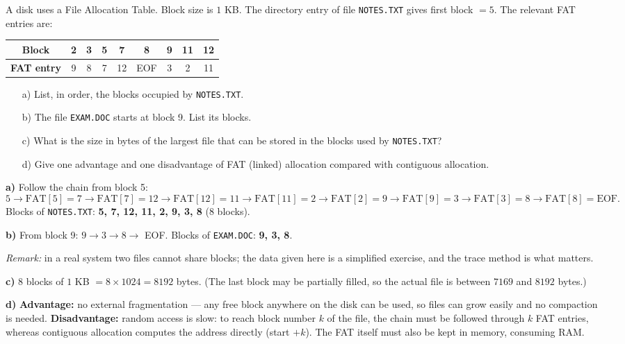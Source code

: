 \documentclass[11pt]{article}
\begin{document}
\begin{exoresolu}
A disk uses a File Allocation Table. Block size is $1$ KB. The directory entry of file \texttt{NOTES.TXT} gives first block $= 5$. The relevant FAT entries are:

\begin{center}
\begin{tabular}{|c|c|c|c|c|c|c|c|c|}
\hline
\rowcolor{popblueL} \textbf{Block} & 2 & 3 & 5 & 7 & 8 & 9 & 11 & 12 \\
\hline
\rowcolor{popblueL} \textbf{FAT entry} & 9 & 8 & 7 & 12 & EOF & 3 & 2 & 11 \\
\hline
\end{tabular}
\end{center}

\begin{enumerate}
\item[a)] List, in order, the blocks occupied by \texttt{NOTES.TXT}.
\item[b)] The file \texttt{EXAM.DOC} starts at block 9. List its blocks.
\item[c)] What is the size in bytes of the largest file that can be stored in the blocks used by \texttt{NOTES.TXT}?
\item[d)] Give one advantage and one disadvantage of FAT (linked) allocation compared with contiguous allocation.
\end{enumerate}
\tcblower
\textbf{a)} Follow the chain from block 5:
\[ 5 \to \text{FAT}[5] = 7 \to \text{FAT}[7] = 12 \to \text{FAT}[12] = 11 \to \text{FAT}[11] = 2 \to \text{FAT}[2] = 9 \to \text{FAT}[9] = 3 \to \text{FAT}[3] = 8 \to \text{FAT}[8] = \text{EOF}. \]
Blocks of \texttt{NOTES.TXT}: \textbf{5, 7, 12, 11, 2, 9, 3, 8} (8 blocks).

\textbf{b)} From block 9: $9 \to 3 \to 8 \to$ EOF. Blocks of \texttt{EXAM.DOC}: \textbf{9, 3, 8}.

\emph{Remark:} in a real system two files cannot share blocks; the data given here is a simplified exercise, and the trace method is what matters.

\textbf{c)} 8 blocks of $1$ KB $= 8 \times 1024 = 8192$ bytes. (The last block may be partially filled, so the actual file is between $7169$ and $8192$ bytes.)

\textbf{d)} \textbf{Advantage:} no external fragmentation — any free block anywhere on the disk can be used, so files can grow easily and no compaction is needed. \textbf{Disadvantage:} random access is slow: to reach block number $k$ of the file, the chain must be followed through $k$ FAT entries, whereas contiguous allocation computes the address directly (start $+ k$). The FAT itself must also be kept in memory, consuming RAM.
\end{exoresolu}
\end{document}
